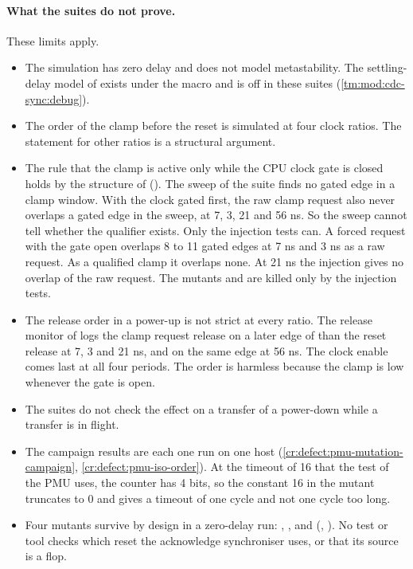 \paragraph{What the suites do not prove.} These limits apply.
\begin{itemize}
  \item The simulation has zero delay and does not model metastability. The settling-delay model of  exists under the macro  and is off in these suites (\cref{tm:mod:cdc-sync:debug}).
  \item The order of the clamp before the reset is simulated at four clock ratios. The statement for other ratios is a structural argument.
  \item The rule that the clamp is active only while the CPU clock gate is closed holds by the structure of  (). The sweep of the suite  finds no gated edge in a clamp window. With the clock gated first, the raw clamp request also never overlaps a gated edge in the sweep, at 7, 3, 21 and 56 ns. So the sweep cannot tell whether the qualifier exists. Only the injection tests can. A forced request with the gate open overlaps 8 to 11 gated edges at 7 ns and 3 ns as a raw request. As a qualified clamp it overlaps none. At 21 ns the injection gives no overlap of the raw request. The mutants  and  are killed only by the injection tests.
  \item The release order in a power-up is not strict at every ratio. The release monitor of  logs the clamp request release on a later edge of  than the reset release at 7, 3 and 21 ns, and on the same edge at 56 ns. The clock enable comes last at all four periods. The order is harmless because the clamp is low whenever the gate is open.
  \item The suites do not check the effect on a transfer of a power-down while a transfer is in flight.
  \item The campaign results are each one run on one host (\cref{cr:defect:pmu-mutation-campaign}, \cref{cr:defect:pmu-iso-order}). At the timeout of 16 that the test of the PMU uses, the counter has 4 bits, so the constant 16 in the mutant  truncates to 0 and gives a timeout of one cycle and not one cycle too long.
  \item Four mutants survive by design in a zero-delay run: , ,  and  (, ). No test or tool checks which reset the acknowledge synchroniser uses, or that its source is a flop.

\end{itemize}
